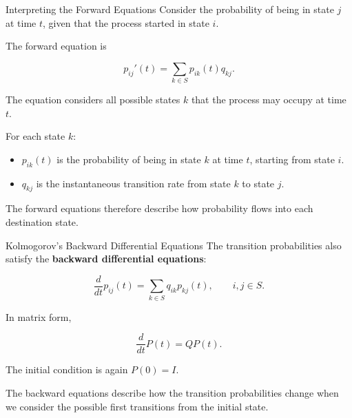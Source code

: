 \documentclass[
  ignorenonframetext,
  aspectratio=169,
]{beamer}
\providecommand{\tightlist}{%
  \setlength{\itemsep}{0pt}\setlength{\parskip}{0pt}}
\begin{document}
\begin{frame}{Interpreting the Forward Equations}
\protect{}\label{interpreting-the-forward-equations}
Consider the probability of being in state \(j\) at time \(t\), given
that the process started in state \(i\).

The forward equation is

\[
p_{ij}'(t)=\sum_{k\in S}p_{ik}(t)q_{kj}.
\]

The equation considers all possible states \(k\) that the process may
occupy at time \(t\).

For each state \(k\):

\begin{itemize}
\tightlist
\item
  \(p_{ik}(t)\) is the probability of being in state \(k\) at time
  \(t\), starting from state \(i\).
\item
  \(q_{kj}\) is the instantaneous transition rate from state \(k\) to
  state \(j\).
\end{itemize}

The forward equations therefore describe how probability flows into each
destination state.
\end{frame}

\begin{frame}{Kolmogorov's Backward Differential Equations}
\protect{}\label{kolmogorovs-backward-differential-equations}
The transition probabilities also satisfy the \textbf{backward
differential equations}:

\[
\boxed{
\frac{d}{dt}p_{ij}(t)
=
\sum_{k\in S}q_{ik}p_{kj}(t),
\qquad i,j\in S.
}
\]

In matrix form,

\[
\boxed{
\frac{d}{dt}P(t)=QP(t).
}
\]

The initial condition is again \(P(0)=I.\)

The backward equations describe how the transition probabilities change
when we consider the possible first transitions from the initial state.
\end{frame}
\end{document}
